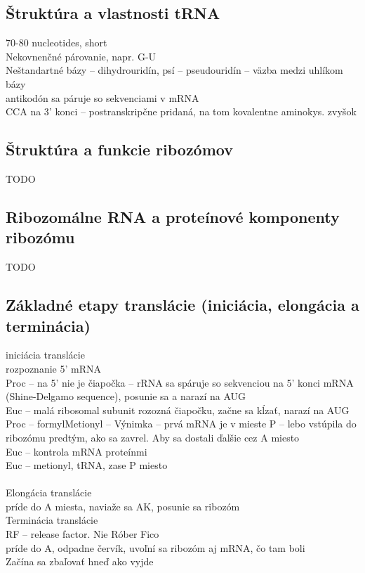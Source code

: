 \subsection*{Štruktúra a vlastnosti tRNA}
70-80 nucleotides, short\\
Nekovnenčné párovanie, napr. G-U\\
Neštandartné bázy -- dihydrouridín, psí -- pseudouridín -- väzba medzi uhlíkom bázy\\
antikodón sa páruje so sekvenciami v mRNA\\
CCA na 3' konci -- postranskripčne pridaná, na tom kovalentne aminokys. zvyšok\\
\subsection*{Štruktúra a funkcie ribozómov}
TODO
\subsection*{Ribozomálne RNA a proteínové komponenty ribozómu}
TODO
\subsection*{Základné etapy translácie (iniciácia, elongácia a terminácia)}
iniciácia translácie \\
\tab rozpoznanie 5' mRNA\\
\tab Proc -- na 5' nie je čiapočka -- rRNA sa spáruje so sekvenciou na 5' konci mRNA (Shine-Delgamo sequence), posunie sa a narazí na AUG \\
\tab Euc -- malá ribosomal subunit rozozná čiapočku, začne sa kĺzať, narazí na AUG \\
\tab Proc -- formylMetionyl -- Výnimka -- prvá mRNA je v mieste P -- lebo vstúpila do ribozómu predtým, ako sa zavrel. Aby sa dostali ďalšie cez A miesto\\
\tab Euc -- kontrola mRNA proteínmi\\
\tab Euc -- metionyl, tRNA, zase P miesto\\
\tab \\
Elongácia translácie\\
\tab príde do A miesta, naviaže sa AK, posunie sa ribozóm\\
Terminácia translácie\\
\tab RF -- release factor. Nie Róber Fico\\
\tab príde do A, odpadne červík, uvoľní sa ribozóm aj mRNA, čo tam boli\\
Začína sa zbaľovať hneď ako vyjde\\
